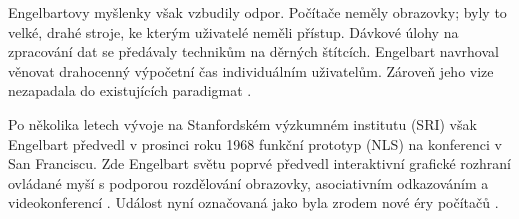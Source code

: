 
Engelbartovy myšlenky však vzbudily odpor. Počítače neměly obrazovky; byly to velké, drahé stroje, ke kterým uživatelé neměli přístup. Dávkové úlohy na zpracování dat se předávaly technikům na děrných štítcích. Engelbart navrhoval věnovat drahocenný výpočetní čas individuálním uživatelům. Zároveň jeho vize nezapadala do existujících paradigmat \autocite[46]{Barnet2014}.

Po několika letech vývoje na Stanfordském výzkumném institutu (SRI) však Engelbart předvedl v prosinci roku 1968 funkční prototyp  (NLS) na konferenci  v San Franciscu. Zde Engelbart světu poprvé předvedl interaktivní grafické rozhraní ovládané myší s podporou rozdělování obrazovky, asociativním odkazováním a videokonferencí \autocite[60]{Barnet2014}. Událost nyní označovaná jako  byla zrodem nové éry počítačů \autocite[61]{Barnet2014}.

